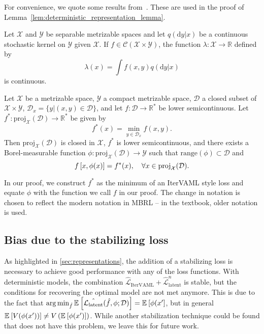 For convenience, we quote some results from~\cite{bertsekasshreve1978}. These are used in the proof of Lemma~\ref{lem:deterministic_representation_lemma}.

\begin{proposition}
\label{prop:730}
    Let $\mathcal{X}$ and $\mathcal{Y}$ be separable metrizable spaces and let $q(\mathrm{d}y|x)$ be a continuous stochastic kernel on $\mathcal{Y}$ given $\mathcal{X}$. If $f\in\mathcal{C}(\mathcal{X}\times \mathcal{Y})$, the function $\lambda: \mathcal{X} \rightarrow \mathbb{R}$ defined by
    \[
        \lambda(x) = \int f(x,y) q(\mathrm{d}y|x)
    \]
    is continuous.
\end{proposition}

\newcommand{\proj}{\text{proj}}
\begin{proposition}
\label{prop:733}
    Let $\mathcal{X}$ be a metrizable space, $\mathcal{Y}$ a compact metrizable space, $\mathcal{D}$ a closed subset of $\mathcal{X}\times\mathcal{Y}$, $\mathcal{D}_x = \{y | (x,y) \in \mathcal{D} \}$, and let $f:\mathcal{D}\rightarrow \mathbb{R}^*$ be lower semicontinuous.
    Let $f^*:\proj_\mathcal{X}(\mathcal{D}) \rightarrow \mathbb{R}^*$ be given by \[
    f^*(x) = \min_{y \in \mathcal{D}_x} f(x,y).
    \]
    Then $\proj_\mathcal{X}(\mathcal{D})$ is closed in $\mathcal{X}$, $f^*$ is lower semicontinuous, and there exists a Borel-measurable function $\phi: \proj_\mathcal{X}(\mathcal{D}) \rightarrow \mathcal{Y}$ such that $\text{range}(\phi) \subset \mathcal{D}$ and \[
    f\squareb{x, \phi(x)} = f^*(x), \quad \forall x \in \proj_\mathcal{X}(\mathcal{D}).
    \]
\end{proposition}

In our proof, we construct $f^*$ as the minimum of an IterVAML style loss and equate $\phi$ with the function we call $f$ in our proof.
The change in notation is chosen to reflect the modern notation in MBRL -- in the textbook, older notation is used.

\subsection{Bias due to the stabilizing loss}
\label{app:bias_latent_model}

As highlighted in \autoref{sec:representations}, the addition of a stabilizing loss is necessary to achieve good performance with any of the loss functions.
With deterministic models, the combination $\hat{\mathcal{L}}_\text{IterVAML} + \hat{\mathcal{L}}^n_\text{latent}$ is stable, but the conditions for recovering the optimal model are not met anymore.
This is due to the fact that $\operatorname*{arg\,min}_{\hat{f}} \mathbb{E}_{}\left[  \hat{\mathcal{L}_\text{latent}}(\hat{f},\phi; \mathcal{D}) \right] = \mathbb{E}_{}\left[  \phi(x' \right]$, but in general $\mathbb{E}_{}\left[  V(\phi(x')) \right] \neq V\left( \mathbb{E}_{}\left[  \phi(x') \right] \right)$.
While another stabilization technique could be found that does not have this problem, we leave this for future work.

